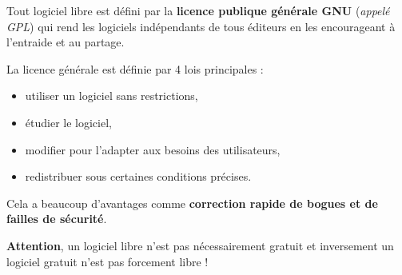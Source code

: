 Tout logiciel libre est défini par la \textbf{licence publique générale GNU} (\textit{appelé GPL})
 qui rend les logiciels indépendants de tous éditeurs en les encourageant à l'entraide et au partage.

La licence générale est définie par 4 lois principales :
\begin{itemize}
	\item utiliser un logiciel sans restrictions,
	\item étudier le logiciel,
	\item modifier pour l'adapter aux besoins des utilisateurs,
	\item redistribuer sous certaines conditions précises.
\end{itemize}
Cela a beaucoup d'avantages comme \textbf{correction rapide de bogues et de failles de sécurité}.

\textbf{Attention}, un logiciel libre n'est pas nécessairement gratuit et inversement un logiciel gratuit n'est pas forcement libre ! \newpage
